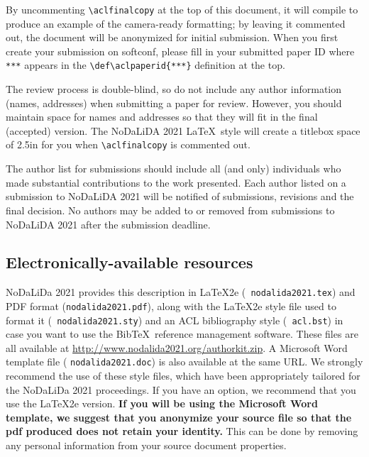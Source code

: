 \documentclass[11pt]{article}
\begin{document}
By uncommenting {\small\verb|\aclfinalcopy|} at the top of this 
 document, it will compile to produce an example of the camera-ready formatting; by leaving it commented out, the document will be anonymized for initial submission.  When you first create your submission on softconf, please fill in your submitted paper ID where {\small\verb|***|} appears in the {\small\verb|\def\aclpaperid{***}|} definition at the top.

The review process is double-blind, so do not include any author information (names, addresses) when submitting a paper for review.  
However, you should maintain space for names and addresses so that they will fit in the final (accepted) version.  The NoDaLiDA 2021 \LaTeX\ style will create a titlebox space of 2.5in for you when {\small\verb|\aclfinalcopy|} is commented out.  

The author list for submissions should include all (and only) individuals who made substantial contributions to the work presented. Each author listed on a submission to NoDaLiDA 2021 will be notified of submissions, revisions and the final decision. No authors may be added to or removed from submissions to NoDaLiDA 2021 after the submission deadline.

\subsection{Electronically-available resources}

NoDaLiDa 2021 provides this description in \LaTeX2e ({\small {\tt
    nodalida2021.tex}}) and PDF format ({\small {\tt nodalida2021.pdf}}),
along with the \LaTeX2e style file used to format it ({\small {\tt
    nodalida2021.sty}}) and an ACL bibliography style ({\small {\tt
    acl.bst}}) in case you want to use the Bib\TeX\ reference management
software. These files are all available at
\url{http://www.nodalida2021.org/authorkit.zip}. A Microsoft Word template file ({\small
  {\tt nodalida2021.doc}}) is also available at the same URL. We strongly
recommend the use of these style files, which have been appropriately
tailored for the NoDaLiDa 2021 proceedings. If you have an option, we
recommend that you use the \LaTeX2e version. \textbf{If you will be
  using the Microsoft Word template, we suggest that you anonymize
  your source file so that the pdf produced does not retain your
  identity.}  This can be done by removing any personal information
from your source document properties.
\end{document}
